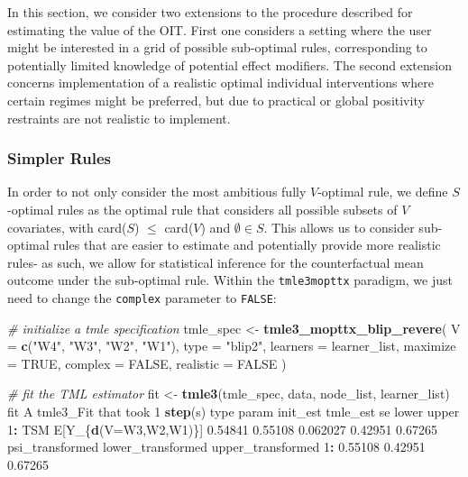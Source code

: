 \documentclass[12pt, krantz2,]{krantz}
\newenvironment{Shaded}{\begin{snugshade}}{\end{snugshade}}
\newcommand{\CommentTok}[1]{\textcolor[rgb]{0.37,0.37,0.37}{\textit{#1}}}
\newcommand{\DataTypeTok}[1]{\textcolor[rgb]{0.27,0.27,0.27}{#1}}
\newcommand{\DecValTok}[1]{\textcolor[rgb]{0.06,0.06,0.06}{#1}}
\newcommand{\FloatTok}[1]{\textcolor[rgb]{0.06,0.06,0.06}{#1}}
\newcommand{\KeywordTok}[1]{\textcolor[rgb]{0.27,0.27,0.27}{\textbf{#1}}}
\newcommand{\NormalTok}[1]{#1}
\newcommand{\OperatorTok}[1]{\textcolor[rgb]{0.43,0.43,0.43}{\textbf{#1}}}
\newcommand{\OtherTok}[1]{\textcolor[rgb]{0.37,0.37,0.37}{#1}}
\newcommand{\StringTok}[1]{\textcolor[rgb]{0.5,0.5,0.5}{#1}}
\theoremstyle{definition}
\theoremstyle{definition}
\theoremstyle{definition}
\newcommand{\1}{\mathbbm{1}}
\begin{document}
In this section, we consider two extensions to the procedure described for
estimating the value of the OIT. First one considers a setting where the user
might be interested in a grid of possible sub-optimal rules, corresponding to
potentially limited knowledge of potential effect modifiers. The second
extension concerns implementation of a realistic optimal individual
interventions where certain regimes might be preferred, but due to practical or
global positivity restraints are not realistic to implement.

\hypertarget{simpler-rules}{%
\subsubsection{Simpler Rules}\label{simpler-rules}}

In order to not only consider the most ambitious fully \(V\)-optimal rule, we
define \(S\)-optimal rules as the optimal rule that considers all possible subsets
of \(V\) covariates, with card(\(S\)) \(\leq\) card(\(V\)) and \(\emptyset \in S\). This
allows us to consider sub-optimal rules that are easier to estimate and
potentially provide more realistic rules- as such, we allow for statistical
inference for the counterfactual mean outcome under the sub-optimal rule.
Within the \texttt{tmle3mopttx} paradigm, we just need to change the \texttt{complex}
parameter to \texttt{FALSE}:

\begin{Shaded}
\begin{Highlighting}[]
\CommentTok{# initialize a tmle specification}
\NormalTok{tmle_spec <-}\StringTok{ }\KeywordTok{tmle3_mopttx_blip_revere}\NormalTok{(}
  \DataTypeTok{V =} \KeywordTok{c}\NormalTok{(}\StringTok{"W4"}\NormalTok{, }\StringTok{"W3"}\NormalTok{, }\StringTok{"W2"}\NormalTok{, }\StringTok{"W1"}\NormalTok{), }\DataTypeTok{type =} \StringTok{"blip2"}\NormalTok{,}
  \DataTypeTok{learners =}\NormalTok{ learner_list,}
  \DataTypeTok{maximize =} \OtherTok{TRUE}\NormalTok{, }\DataTypeTok{complex =} \OtherTok{FALSE}\NormalTok{, }\DataTypeTok{realistic =} \OtherTok{FALSE}
\NormalTok{)}
\end{Highlighting}
\end{Shaded}

\begin{Shaded}
\begin{Highlighting}[]
\CommentTok{# fit the TML estimator}
\NormalTok{fit <-}\StringTok{ }\KeywordTok{tmle3}\NormalTok{(tmle_spec, data, node_list, learner_list)}
\NormalTok{fit}
\NormalTok{A tmle3_Fit that took }\DecValTok{1} \KeywordTok{step}\NormalTok{(s)}
\NormalTok{   type                param init_est tmle_est       se   lower   upper}
\DecValTok{1}\OperatorTok{:}\StringTok{  }\NormalTok{TSM E[Y_\{}\KeywordTok{d}\NormalTok{(}\DataTypeTok{V=}\NormalTok{W3,W2,W1)\}]  }\FloatTok{0.54841}  \FloatTok{0.55108} \FloatTok{0.062027} \FloatTok{0.42951} \FloatTok{0.67265}
\NormalTok{   psi_transformed lower_transformed upper_transformed}
\DecValTok{1}\OperatorTok{:}\StringTok{         }\FloatTok{0.55108}           \FloatTok{0.42951}           \FloatTok{0.67265}
\end{Highlighting}
\end{Shaded}
\end{document}
